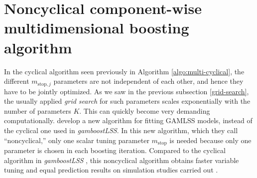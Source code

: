\section{Noncyclical component-wise multidimensional boosting algorithm}
In the cyclical algorithm seen previously in Algorithm \ref{algo:multi-cyclical}, the different $m_{\text{stop},j}$ parameters are not independent of each other, and hence they have to be jointly optimized. As we saw in the previous subsection \ref{grid-search}, the usually applied \textit{grid search} for such parameters scales exponentially with the number of parameters $K$. This can quickly become very demanding computationally. \citet{thomas2018} develop a new algorithm for fitting GAMLSS models, instead of the cyclical one used in \textit{gamboostLSS}. In this new algorithm, which they call ``noncyclical,'' only one scalar tuning parameter $m_{\text{stop}}$ is needed because only one parameter is chosen in each boosting iteration. Compared to the cyclical algorithm in \textit{gamboostLSS} \citep{gamboostlss-paper}, this noncyclical algorithm obtains faster variable tuning and equal prediction results on simulation studies carried out \citep{thomas2018}.

